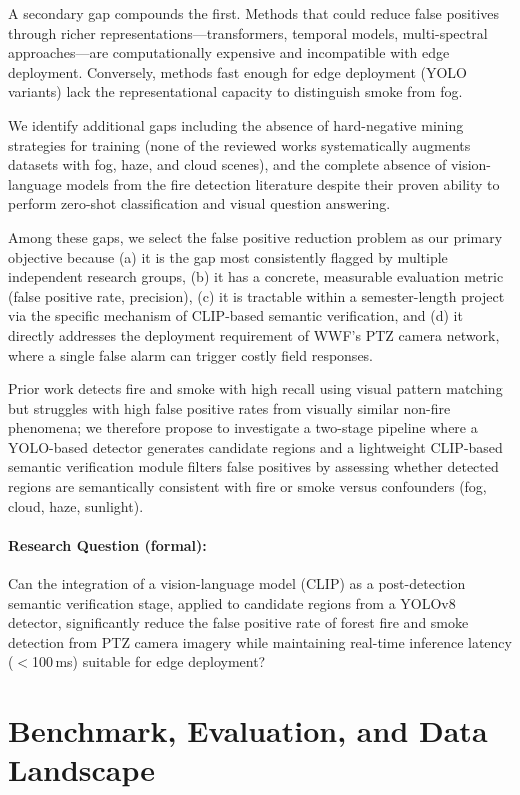 \documentclass[11pt,twocolumn]{article}
\begin{document}
A secondary gap compounds the first. Methods that could reduce false positives through richer representations---transformers, temporal models, multi-spectral approaches---are computationally expensive and incompatible with edge deployment. Conversely, methods fast enough for edge deployment (YOLO variants) lack the representational capacity to distinguish smoke from fog.

We identify additional gaps including the absence of hard-negative mining strategies for training (none of the reviewed works systematically augments datasets with fog, haze, and cloud scenes), and the complete absence of vision-language models from the fire detection literature despite their proven ability to perform zero-shot classification and visual question answering.

Among these gaps, we select the false positive reduction problem as our primary objective because (a) it is the gap most consistently flagged by multiple independent research groups, (b) it has a concrete, measurable evaluation metric (false positive rate, precision), (c) it is tractable within a semester-length project via the specific mechanism of CLIP-based semantic verification, and (d) it directly addresses the deployment requirement of WWF's PTZ camera network, where a single false alarm can trigger costly field responses.

Prior work detects fire and smoke with high recall using visual pattern matching but struggles with high false positive rates from visually similar non-fire phenomena; we therefore propose to investigate a two-stage pipeline where a YOLO-based detector generates candidate regions and a lightweight CLIP-based semantic verification module filters false positives by assessing whether detected regions are semantically consistent with fire or smoke versus confounders (fog, cloud, haze, sunlight).

\paragraph{Research Question (formal):}
Can the integration of a vision-language model (CLIP) as a post-detection semantic verification stage, applied to candidate regions from a YOLOv8 detector, significantly reduce the false positive rate of forest fire and smoke detection from PTZ camera imagery while maintaining real-time inference latency ($<$100\,ms) suitable for edge deployment?

\section{Benchmark, Evaluation, and Data Landscape}
\label{sec:benchmarks}
\end{document}
